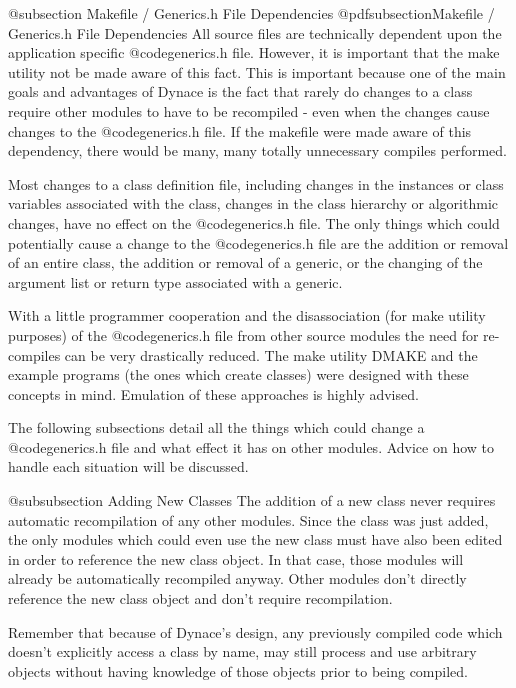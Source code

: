 @subsection Makefile / Generics.h File Dependencies
@pdfsubsection{Makefile / Generics.h File Dependencies}
All source files are technically dependent upon the application specific
@code{generics.h} file.  However, it is important that the make utility
not be made aware of this fact.  This is important because one of the main
goals and advantages of Dynace is the fact that rarely do changes to a class
require other modules to have to be recompiled - even when the changes
cause changes to the @code{generics.h} file.  If the makefile were
made aware of this dependency, there would be many, many totally
unnecessary compiles performed.

Most changes to a class definition file, including changes in the
instances or class variables associated with the class, changes in the
class hierarchy or algorithmic changes, have no effect on the
@code{generics.h} file.  The only things which could potentially cause a
change to the @code{generics.h} file are the addition or removal of an
entire class, the addition or removal of a generic, or the changing of
the argument list or return type associated with a generic.

With a little programmer cooperation and the disassociation (for make
utility purposes) of the @code{generics.h} file from other source
modules the need for re-compiles can be very drastically reduced.  The
make utility DMAKE and the example programs (the ones which create
classes) were designed with these concepts in mind.  Emulation of
these approaches is highly advised.

The following subsections detail all the things which could change
a @code{generics.h} file and what effect it has on other modules.
Advice on how to handle each situation will be discussed.

@subsubsection Adding New Classes
The addition of a new class never requires automatic recompilation
of any other modules.  Since the class was just added, the only modules
which could even use the new class must have also been edited in
order to reference the new class object.  In that case, those modules
will already be automatically recompiled anyway.  Other modules
don't directly reference the new class object and don't require
recompilation.

Remember that because of Dynace's design, any previously compiled code
which doesn't explicitly access a class by name, may still process
and use arbitrary objects without having knowledge of those objects
prior to being compiled.

